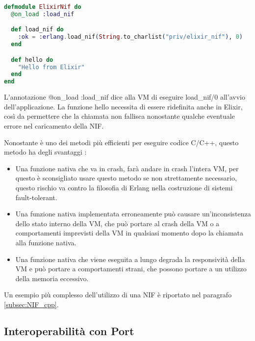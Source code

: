 \begin{lstlisting}[language=elixir, caption={Caricamento NIF},
	captionpos=b,label={lst:elixir_nif}]
defmodule ElixirNif do
  @on_load :load_nif

  def load_nif do
	:ok = :erlang.load_nif(String.to_charlist("priv/elixir_nif"), 0)
  end

  def hello do
    "Hello from Elixir"
  end
end
\end{lstlisting}

L'annotazione @on\_load :load\_nif dice alla VM di eseguire load\_nif/0
all'avvio dell'applicazione.
La funzione hello necessita di essere ridefinita anche in Elixir,
così da permettere che la chiamata non fallisca nonostante qualche
eventuale errore nel caricamento della NIF.

Nonostante è uno dei metodi più efficienti per eseguire codice C/C++,
questo metodo ha degli svantaggi \cite{Erlanger73:online}:

\begin{itemize}
	\item Una funzione nativa che va in crash, farà andare in crash l'intera
	VM, per questo è sconsigliato usare questo metodo se non strettamente necessario,
	questo rischio va contro la filosofia di Erlang nella costruzione di sistemi
	fault-tolerant.
	\item Una funzione nativa implementata erroneamente può causare
	un'inconsistenza dello stato interno della VM, che può portare 
	al crash della VM o a comportamenti imprevisti della VM in 
	qualsiasi momento dopo la chiamata alla funzione nativa.
	\item Una funzione nativa che viene eseguita a lungo degrada la
	responsività della VM e può portare a comportamenti strani, che possono
	portare a un utilizzo della memoria eccessivo.
\end{itemize}

Un esempio più complesso dell'utilizzo di una NIF è riportato
nel paragrafo \ref{subsec:NIF_cpp}.

\subsection{Interoperabilità con Port}

